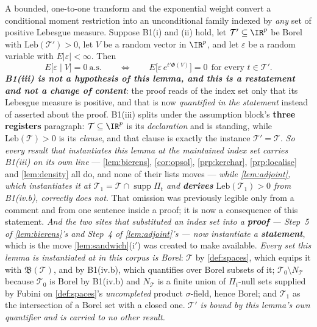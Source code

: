 \begin{lemma}\label{lem:bierenscore}
A bounded, one-to-one transform and the exponential weight convert a conditional moment restriction into
an unconditional family indexed by \emph{any} set of positive Lebesgue measure.
Suppose B1(i) and (ii) hold, let $\mathcal T'\subseteq\IR^{p}$ be Borel with
$\mathrm{Leb}(\mathcal T')>0$, let $V$ be a random vector in $\IR^{p}$, and let $\varepsilon$ be a random
variable with $E|\varepsilon|<\infty$. Then
\[
E\big[\varepsilon\mid V\big]=0\ \text{a.s.}
\qquad\Longleftrightarrow\qquad
E\big[\varepsilon\,e^{t'\Phi(V)}\big]=0\ \ \text{for every }t\in\mathcal T' .
\]
\emph{\textbf{B1(iii) is not a hypothesis of this lemma, and this is a restatement and not a change of
content}}: the proof reads of the index set only that its Lebesgue measure is positive, and that is now
\emph{quantified in the statement} instead of asserted about the proof. B1(iii) splits under the
assumption block's \textbf{three registers} paragraph: $\mathcal T\subseteq\IR^{p}$ is its
\emph{declaration} and is standing, while $\mathrm{Leb}(\mathcal T)>0$ is its \emph{clause}, and that
clause is exactly the instance $\mathcal T'=\mathcal T$.
\emph{So every result that instantiates this lemma at the maintained index set carries B1(iii) on its own
line} --- \cref{lem:bierens}, \cref{cor:opsol}, \cref{prp:kerchar}, \cref{prp:localise} and
\cref{lem:density} all do, and none of their lists moves ---
\emph{while \cref{lem:adjoint}, which instantiates it at $\mathcal T_1=\mathcal T\cap\operatorname{supp}\Pi_t$
and \textbf{derives} $\mathrm{Leb}(\mathcal T_1)>0$ from B1(iv.b), correctly does not}. That omission was
previously legible only from a comment and from one sentence inside a proof; it is now a consequence of
this statement. \emph{And the two sites that substituted an index set into a \textbf{proof} --- Step~5 of
\cref{lem:bierens}'s and Step~4 of \cref{lem:adjoint}'s --- now instantiate a \textbf{statement}}, which
is the move \cref{lem:sandwich}\textup{(i$'$)} was created to make available.
\emph{Every set this lemma is instantiated at in this corpus is Borel}: $\mathcal T$ by
\cref{def:spaces}, which equips it with $\mathfrak B(\mathcal T)$, and by B1(iv.b), which quantifies over
Borel subsets of it; $\mathcal T_0\setminus N_{\mathcal T}$ because $\mathcal T_0$ is Borel by B1(iv.b)
and $N_{\mathcal T}$ is a finite union of $\Pi_t$-null sets supplied by Fubini on \cref{def:spaces}'s
\emph{uncompleted} product $\sigma$-field, hence Borel; and $\mathcal T_1$ as the intersection of a Borel
set with a closed one. \emph{$\mathcal T'$ is bound by this lemma's own quantifier and is carried to no
other result.}
\end{lemma}

